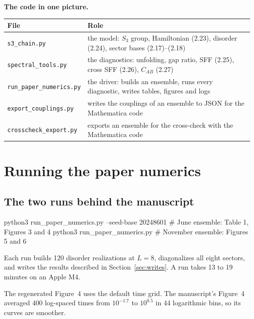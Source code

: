 \documentclass[11pt,a4paper]{article}
\newcommand{\code}[1]{\texttt{\textcolor{codeink}{#1}}}
\newcommand{\lead}[1]{\textbf{#1}\enspace}
\begin{document}
\lead{The code in one picture.}\par
\begingroup\small
\begin{tabularx}{\linewidth}{L{4.6cm}Y}
\toprule{}\textbf{File} & \textbf{Role}\\\midrule
\code{s3\_chain.py} & the model: $S_3$ group, Hamiltonian (2.23), disorder (2.24), sector bases (2.17)--(2.18)\\
\code{spectral\_tools.py} & the diagnostics: unfolding, gap ratio, SFF (2.25), cross SFF (2.26), $C_{AB}$ (2.27)\\
\code{run\_paper\_numerics.py} & the driver: builds an ensemble, runs every diagnostic, writes tables, figures and logs\\
\code{export\_couplings.py} & writes the couplings of an ensemble to JSON for the Mathematica code\\
\code{crosscheck\_export.py} & exports an ensemble for the cross-check with the Mathematica code\\
\bottomrule
\end{tabularx}\par
\endgroup

\section{Running the paper numerics}\label{sec:running}

\subsection{The two runs behind the manuscript}\label{sec:tworuns}

\begin{shell}
python3 run_paper_numerics.py --seed-base 20248601     # June ensemble: Table 1, Figures 3 and 4
python3 run_paper_numerics.py                          # November ensemble: Figures 5 and 6
\end{shell}

Each run builds 120 disorder realizations at $L = 8$, diagonalizes all eight sectors, and writes the results
described in Section~\ref{sec:writes}. A run takes 13 to 19 minutes on an Apple M4.

The regenerated Figure~4 uses the default time grid. The manuscript's Figure~4 averaged 400 log-spaced times from
$10^{-1.7}$ to $10^{0.5}$ in 44 logarithmic bins, so its curves are smoother.
\end{document}
